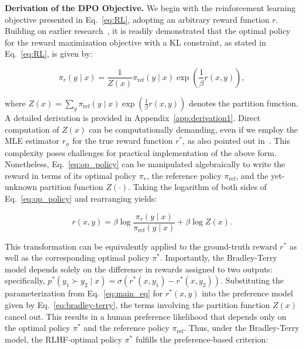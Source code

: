 \textbf{Derivation of the DPO Objective.} We begin with the reinforcement learning objective presented in Eq.~\ref{eq:RL}, adopting an arbitrary reward function $r$. Building on earlier research~\citep{peters2007reinforcement, peng2019advantage, korbak2022reinforcement, go2023aligning}, it is readily demonstrated that the optimal policy for the reward maximization objective with a KL constraint, as stated in Eq.~\ref{eq:RL}, is given by:

\begin{equation}\label{eq:op_policy}
    \pi_r(y\mid x) = \frac{1}{Z(x)}\pi_\text{ref}(y\mid x)\exp\left(\frac{1}{\beta}r(x, y)\right),
\end{equation}

where $Z(x) =\sum_{y}\pi_\text{ref}(y\mid x)\exp\left(\frac{1}{\beta}r(x, y)\right)$ denotes the partition function. A detailed derivation is provided in Appendix~\ref{app:derivation1}. Direct computation of $Z(x)$ can be computationally demanding, even if we employ the MLE estimator $r_{\phi}$ for the true reward function $r^*$, as also pointed out in~\citep{korbak2022reinforcement, go2023aligning}. This complexity poses challenges for practical implementation of the above form. Nonetheless, Eq.~\ref{eq:op_policy} can be manipulated algebraically to write the reward in terms of its optimal policy $\pi_r$, the reference policy $\pi_\text{ref}$, and the yet-unknown partition function $Z(\cdot)$. Taking the logarithm of both sides of Eq.~\ref{eq:op_policy} and rearranging yields:

\begin{equation}\label{eq:main_eq}
    r(x,y) =\beta \log \frac{\pi_r(y\mid x)}{\pi_\text{ref}(y\mid x)} + \beta \log Z(x).
\end{equation}

This transformation can be equivalently applied to the ground-truth reward $r^*$ as well as the corresponding optimal policy $\pi^*$. Importantly, the Bradley-Terry model depends solely on the difference in rewards assigned to two outputs: specifically, ${p^*(y_1 \succ y_2 \mid x) = \sigma(r^*(x, y_1) - r^*(x, y_2))}$. Substituting the parameterization from Eq.~\ref{eq:main_eq} for $r^*(x,y)$ into the preference model given by Eq.~\ref{eq:bradley-terry}, the terms involving the partition function $Z(x)$ cancel out. This results in a human preference likelihood that depends only on the optimal policy $\pi^*$ and the reference policy $\pi_\text{ref}$. Thus, under the Bradley-Terry model, the RLHF-optimal policy $\pi^*$ fulfills the preference-based criterion:

